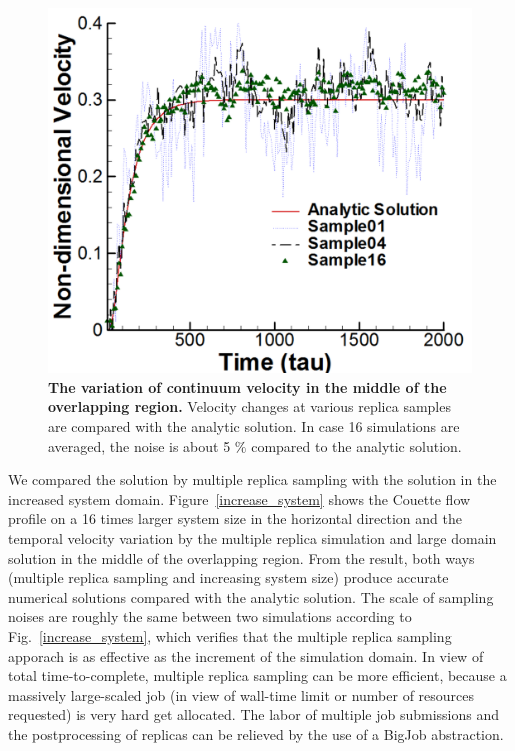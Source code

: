 \documentclass[preprint,12pt]{elsarticle}
\begin{document}
\begin{figure}
\centering
\includegraphics[width=0.6\linewidth]{Couette_025_Temporal_Multiset.pdf}
\vskip-0.2cm
\caption{\small {\bf The variation of continuum velocity in the middle of the overlapping region.} Velocity changes at various replica samples are compared with the analytic solution. In case 16 simulations are averaged, the noise is about 5 $\%$ compared to the analytic solution.}
\label{multiple_couette_temporal}
\end{figure}


We compared the solution by multiple replica sampling with the solution in the increased system domain. Figure~\ref{increase_system} shows the Couette flow profile on a 16 times larger system size in the horizontal direction and the temporal velocity variation by the multiple replica simulation and large domain solution in the middle of the overlapping region. From the result, both ways (multiple replica sampling and increasing system size) produce accurate numerical solutions compared with the analytic solution. The scale of sampling noises are roughly the same between two simulations according to Fig.~\ref{increase_system}, which verifies that the multiple replica sampling apporach is as effective as the increment of the simulation domain. In view of total time-to-complete, multiple replica sampling can be more efficient, because a massively large-scaled job (in view of wall-time limit or number of resources requested) is very hard get allocated. The labor of multiple job submissions and the postprocessing of replicas can be relieved by the use of a BigJob abstraction.
\end{document}
